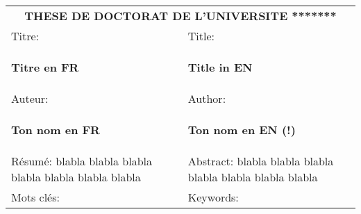 \newpage
\addtolength{\headheight}{-1cm}
\addtolength{\textwidth}{5cm}
\addtolength{\hoffset}{-1.8cm}
\pageblanche
\thispagestyle{empty}

\begin{table}
\begin{center}
 \begin{tabular}{p{8.8cm} p{1pt} p{8.8cm}}
   \multicolumn{3}{c}{{\large {\bf THESE DE DOCTORAT DE L'UNIVERSITE *******}}\vspace{.6cm}} \\

   Titre: & & Title: \\  
\begin{center}\vspace{-.8cm}\textbf{Titre en FR} \end{center}
& &
\begin{center}\vspace{-.8cm}\textbf{Title in EN} \end{center}
\\  

\vspace{-0.8cm}Auteur: & & \vspace{-0.8cm} Author: \\ 
\begin{center}\vspace{-1cm}\textbf{Ton nom en FR}
\end{center} & & 
\begin{center}\vspace{-1cm}\textbf{Ton nom en EN (!)}
\end{center} \\

\footnotesize{
R\'esum\'e: blabla blabla blabla blabla blabla blabla blabla}
& & 
\footnotesize{
Abstract: blabla blabla blabla blabla blabla blabla blabla }

\\
Mots cl\'es: & & Keywords: 

\end{tabular}
\end{center}
\end{table}

